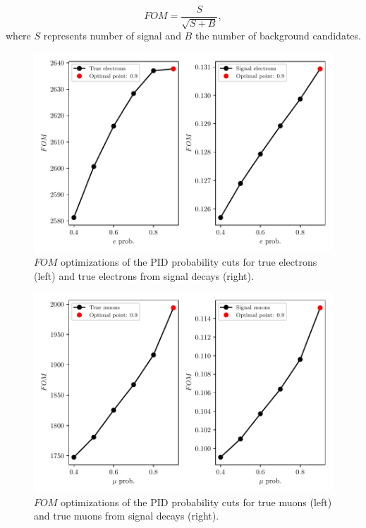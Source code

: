 \documentclass[oneside,a4paper,openany,12pt]{scrbook}
\begin{document}
\begin{equation}
\label{eq:fom}
FOM = \frac{S}{\sqrt{S+B}},
\end{equation} 
where $S$ represents number of signal and $B$ the number of background candidates.

\begin{figure}[H]
\centering
\captionsetup{width=.7\linewidth}
\includegraphics[scale=0.8]{fig/FSP_e_fom}
\caption{$FOM$ optimizations of the PID probability cuts for true electrons (left) and true electrons from signal decays (right).}
\label{fig:efom}
\end{figure}

\begin{figure}[H]
\centering
\captionsetup{width=.7\linewidth}
\includegraphics[scale=0.8]{fig/FSP_mu_fom}
\caption{$FOM$ optimizations of the PID probability cuts for true muons (left) and true muons from signal decays (right).}
\label{fig:mufom}
\end{figure}
\end{document}
